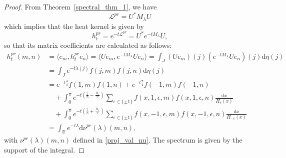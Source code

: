 \documentclass[11pt]{amsart}
\newcommand{\R}{\mathbb{R}}
\theoremstyle{definition}
\theoremstyle{remark}
\theoremstyle{plain}
\numberwithin{equation}{section}
\numberwithin{lemma}{section}
\numberwithin{definition}{section}
\numberwithin{proposition}{section}
\numberwithin{corollary}{section}
\numberwithin{theorem}{section}
\numberwithin{remark}{section}
\begin{document}
\begin{proof}
 From Theorem~\ref{spectral_thm_1}, we have 
 $$
 \mathcal{L}^{pr}=U^*M_{\lambda}U
 $$
 which implies that the heat kernel is given by 
 $$
 h_t^{pr}=e^{-t\mathcal{L}^{pr}}=U^*e^{-tM_{\lambda}}U, 
 $$
 so that its matrix coefficients are calculated as follows:
\begin{align*}
  h_t^{pr}(m,n)&=\langle e_m, h_t^{pr}e_n \rangle = \langle Ue_m, e^{-tM_{\lambda}}Ue_n \rangle = \int_J (Ue_m)(j) (e^{-tM_{\lambda}}Ue_n)(j)\mathrm{d}\eta(j) \\
  &=\int_J e^{-t\lambda(j)} f(j,m) f(j,n)\mathrm{d}\eta(j) \\
&= e^{-t\frac{3}{4}} f(1,m)f(1,n) +e^{-t\frac{7}{4}} f(-1,m)f(-1,n) \\
 & \quad + \int_0^\pi e^{-t(\frac{7}{8}-\frac{R_x}{2})} \sum_{\epsilon\in\{\pm1\}} f(x,1,\epsilon,m) f(x,1,\epsilon,n) \frac{\mathrm{d}x}{H_{\epsilon}(x)} \\
 & \quad + \int_0^\pi e^{-t(\frac{7}{8}+\frac{R_x}{2})} \sum_{\epsilon\in\{\pm1\}} f(x,-1,\epsilon,m) f(x,-1,\epsilon,n) \frac{\mathrm{d}x}{H_{-\epsilon}(x)} \\
 &=\int_{\R} e^{-t\lambda} \mathrm{d}\nu^{pr}(\lambda)(m,n),
\end{align*}
with $\nu^{pr}(\lambda)(m,n)$ defined in \eqref{proj_val_nu}.
The spectrum is given by the support of the integral.
\end{proof}
\end{document}
